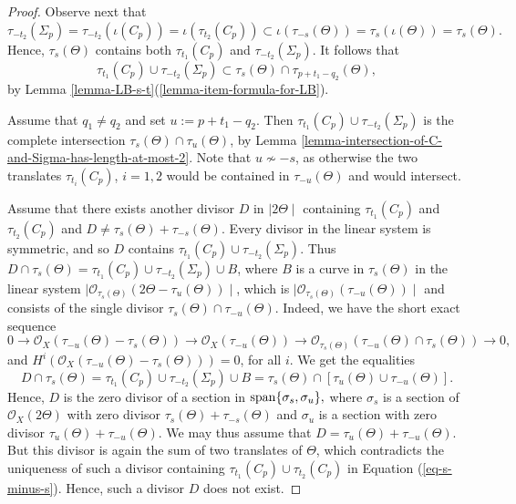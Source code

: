 \documentclass[12pt]{amsart}
\numberwithin{equation}{subsection}
\theoremstyle{plain}
\theoremstyle{definition}
\newcommand{\linsys}[1]{{\mid}#1{\mid}}
\newcommand{\StructureSheaf}[1]{{\mathcal O}_{#1}}
\renewcommand{\span}{{\rm span}}
\begin{document}
{\begin{proof}
Observe next that $\tau_{-t_2}(\Sigma_p)=\tau_{-t_2}(\iota(C_p))=\iota(\tau_{t_2}(C_p))\subset \iota(\tau_{-s}(\Theta))=\tau_s(\iota(\Theta))=\tau_s(\Theta).$ Hence, $\tau_s(\Theta)$ contains both $\tau_{t_1}(C_p)$ and $\tau_{-t_2}(\Sigma_p)$. It follows that 
\[
\tau_{t_1}(C_p)\cup \tau_{-t_2}(\Sigma_p)\subset\tau_s(\Theta)\cap\tau_{p+t_1-q_2}(\Theta), 
\]
by Lemma \ref{lemma-LB-s-t}(\ref{lemma-item-formula-for-LB}). 

Assume that $q_1\neq q_2$ and set $u:=p+t_1-q_2$. Then $\tau_{t_1}(C_p)\cup \tau_{-t_2}(\Sigma_p)$ is the complete intersection
$\tau_s(\Theta)\cap\tau_u(\Theta)$, by Lemma \ref{lemma-intersection-of-C-and-Sigma-has-length-at-most-2}.
Note that $u\not\sim -s$, as otherwise the two translates $\tau_{t_i}(C_p)$, $i=1,2$ would be contained in $\tau_{-u}(\Theta)$ and would intersect. 

Assume that there exists another divisor $D$ in $\linsys{2\Theta}$ containing $\tau_{t_1}(C_p)$ and $\tau_{t_2}(C_p)$ and
$D\neq \tau_s(\Theta)+\tau_{-s}(\Theta)$.
Every divisor in the linear system is symmetric, and so $D$ contains $\tau_{t_1}(C_p)\cup \tau_{-t_2}(\Sigma_p)$.
Thus $D\cap \tau_s(\Theta)=\tau_{t_1}(C_p)\cup \tau_{-t_2}(\Sigma_p)\cup B$,
where $B$ is a curve in $\tau_s(\Theta)$ in the linear system
$\linsys{\StructureSheaf{\tau_s(\Theta)}(2\Theta-\tau_u(\Theta))}$, which is $\linsys{\StructureSheaf{\tau_s(\Theta)}(\tau_{-u}(\Theta))}$
and consists of the single divisor $\tau_s(\Theta)\cap\tau_{-u}(\Theta)$. Indeed, we have the short exact sequence
\[
0\rightarrow \StructureSheaf{X}(\tau_{-u}(\Theta)-\tau_s(\Theta))\rightarrow 
\StructureSheaf{X}(\tau_{-u}(\Theta))\rightarrow
\StructureSheaf{\tau_s(\Theta)}(\tau_{-u}(\Theta)\cap \tau_s(\Theta))\rightarrow 0,
\]
and $H^i(\StructureSheaf{X}(\tau_{-u}(\Theta)-\tau_s(\Theta)))=0$, for all $i$.
We get the equalities
\[
D\cap\tau_s(\Theta)=\tau_{t_1}(C_p)\cup \tau_{-t_2}(\Sigma_p)\cup B=\tau_{s}(\Theta)\cap[\tau_u(\Theta)\cup\tau_{-u}(\Theta)].
\]
Hence, $D$ is the zero divisor of a section in $\span\{\sigma_s,\sigma_u\},$
where $\sigma_s$ is a section of $\StructureSheaf{X}(2\Theta)$ with zero divisor $\tau_s(\Theta)+\tau_{-s}(\Theta)$
and $\sigma_u$ is a section with zero divisor $\tau_u(\Theta)+\tau_{-u}(\Theta)$. We may thus assume that $D=\tau_u(\Theta)+\tau_{-u}(\Theta).$ But this divisor is again the sum of two translates of $\Theta$, which contradicts the uniqueness of such a divisor containing
$\tau_{t_1}(C_p)\cup \tau_{t_2}(C_p)$ in
Equation (\ref{eq-s-minus-s}). Hence, such a divisor $D$ does not exist.
\end{proof}


}
\end{document}
